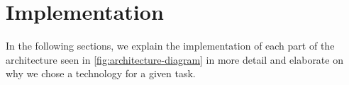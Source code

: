 \chapter{Implementation}
\label{sec:implementation}

In the following sections, we explain the implementation of each part of the architecture seen in
\autoref{fig:architecture-diagram} in more detail and elaborate on why we chose a technology for a
given task.










